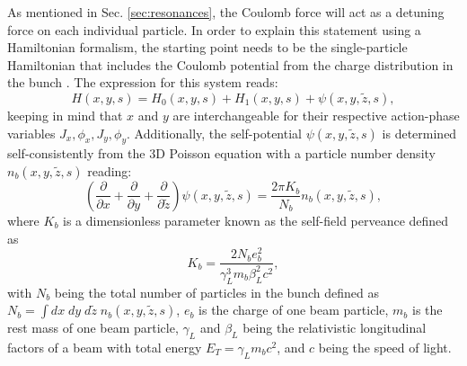 As mentioned in Sec. \ref{sec:resonances}, the Coulomb force will act as a detuning force on each individual particle. In order to explain this statement using a Hamiltonian formalism, the starting point needs to be the single-particle Hamiltonian that includes the Coulomb potential from the charge distribution in the bunch \cite{witchcraft}. The expression for this system reads:
\begin{equation}
    \label{eq:hpsi}
    H(x,y,s)=H_{0}(x,y,s)+H_{1}(x,y,s)+\psi(x,y,\tilde{z},s), 
\end{equation}     
keeping in mind that $x$ and $y$ are interchangeable for their respective action-phase variables $J_x,\phi_x,J_y, \phi_y$. Additionally, the self-potential $\psi(x,y,\tilde{z},s)$ is determined self-consistently from the 3D Poisson equation with a particle number density $n_b(x,y,\tilde{z},s)$ reading:
\begin{equation}
    \label{eq:poisson1}
    \left( \frac{\partial}{\partial x}+\frac{\partial}{\partial y}+\frac{\partial}{\partial \tilde{z}}\right)\psi (x,y,\tilde{z},s)=\frac{2 \pi K_b}{N_b}n_b(x,y,\tilde{z},s), 
\end{equation}
where $K_b$ is a dimensionless parameter known as the self-field perveance defined as
\begin{equation}
    \label{eq:perv}
    K_b = \frac{2 N_b e_b^2}{\gamma _L^3 m_b \beta_L^2 c^2},
\end{equation}
with $N_b$ being the total number of particles in the bunch defined as $N_b=\int dx \; dy \; d\tilde{z} \; n_b(x,y,\tilde{z},s)$, $e_b$ is the charge of one beam particle, $m_b$ is the rest mass of one beam particle, $\gamma_L$ and $\beta_L$ being the relativistic longitudinal factors of a beam with total energy $E_T=\gamma_L m_b c^2$, and $c$ being the speed of light.  